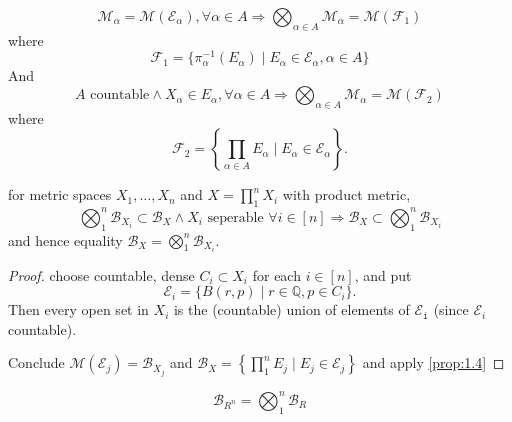 \begin{prop}\label{prop:1.4}
  \[
  \mathcal{M}_\alpha=\mathcal{M}(\mathcal{E}_\alpha),\forall\alpha\in A
  \Rightarrow
  \bigotimes_{\alpha\in A}\mathcal{M}_\alpha=\mathcal{M}(\mathcal{F}_1)
  \]
  where
  \[
  \mathcal{F}_1=
  \{\pi_\alpha^{-1}(E_\alpha)\mid E_\alpha\in\mathcal{E}_\alpha , \alpha\in A\}
  \]
  And
  \[
  A \text{ countable}\land X_\alpha\in E_\alpha, \forall\alpha\in A
  \Rightarrow
  \bigotimes_{\alpha\in A}\mathcal{M}_\alpha=\mathcal{M}(\mathcal{F}_2)
  \]
  where
  \[
  \mathcal{F}_2=
  \left\{\prod_{\alpha\in A} E_\alpha\mid E_\alpha\in\mathcal{E}_\alpha\right\}.
  \]
\end{prop}

\begin{prop}\label{prop:1.5}
  for metric spaces ${X_1,\ldots ,X_n}$ and ${X=\prod_1^n X_i}$
  with product metric,
  \[
  \bigotimes_1^n \mathcal{B}_{X_i} \subset \mathcal{B}_X
  \land X_i \text{ seperable } \forall i\in [n]
  \Longrightarrow
  \mathcal{B}_X \subset \bigotimes_1^n \mathcal{B}_{X_i}
  \]
  and hence equality
  ${\mathcal{B}_X = \bigotimes_1^n \mathcal{B}_{X_i}}$.
\end{prop}
\begin{proof}
  choose countable, dense ${C_i\subset X_i}$ for each ${i\in [n]}$,
  and put
  \[ \mathcal{E}_i=\{B(r, p)\mid r\in \mathbb{Q}, p\in C_i\}. \]
  Then every open set in $X_i$ is the (countable) union
  of elements of $\mathtt{\mathcal{E}_i}$
  (since $\mathcal{E}_i$ countable).



  Conclude ${\mathcal{M}(\mathcal{E}_j) = \mathcal{B}_{X_j}}$ and
  ${\mathcal{B}_X = \left\{\prod_1^n E_j\mid E_j\in\mathcal{E}_j\right\}}$
  and apply \ref{prop:1.4}

\end{proof}

\begin{cor}\label{cor:1.6}\label{cor:01:borelreals}
  \[ \mathcal{B}_{R^n} = \bigotimes_1^n \mathcal{B}_R \]
\end{cor}

